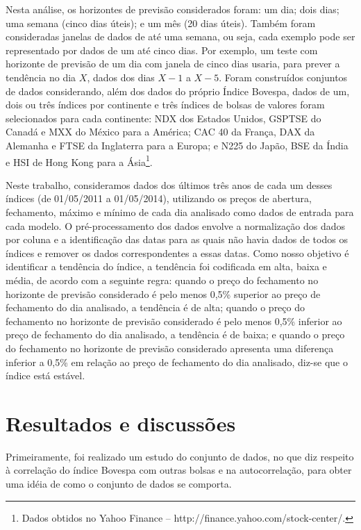 \documentclass[12pt,a4paper,utf8]{ppgsi}
\begin{document}
    Nesta análise, os horizontes de previsão considerados foram: um dia; dois dias; uma semana (cinco dias úteis); e um mês (20 dias úteis). Também foram consideradas janelas de dados de até uma semana, ou seja, cada exemplo pode ser representado por dados de um até cinco dias. Por exemplo, um teste com horizonte de previsão de um dia com janela de cinco dias usaria, para prever a tendência no dia $X$, dados dos dias $X-1$ a $X-5$. Foram construídos conjuntos de dados considerando, além dos dados do próprio Índice Bovespa, dados de um, dois ou três índices por continente e três índices de bolsas de valores foram selecionados para cada continente: NDX dos Estados Unidos, GSPTSE do Canadá e MXX do México para a América; CAC 40 da França, DAX da Alemanha e FTSE da Inglaterra para a Europa; e N225 do Japão, BSE da Índia e HSI de Hong Kong para a Ásia\footnote{Dados obtidos no Yahoo Finance -- http://finance.yahoo.com/stock-center/.}.

    Neste trabalho, consideramos dados dos últimos três anos de cada um desses índices (de 01/05/2011 a 01/05/2014), utilizando os preços de abertura, fechamento, máximo e mínimo de cada dia analisado como dados de entrada para cada modelo. O pré-processamento dos dados envolve a normalização dos dados por coluna e a identificação das datas para as quais não havia dados de todos os índices e remover os dados correspondentes a essas datas. Como nosso objetivo é identificar a tendência do índice, a tendência foi codificada em alta, baixa e média, de acordo com a seguinte regra: quando o preço do fechamento no horizonte de previsão considerado é pelo menos 0,5\% superior ao preço de fechamento do dia analisado, a tendência é de alta; quando o preço do fechamento no horizonte de previsão considerado é pelo menos 0,5\% inferior ao preço de fechamento do dia analisado, a tendência é de baixa; e  quando o preço do fechamento no horizonte de previsão considerado apresenta uma diferença inferior a 0,5\% em relação ao preço de fechamento do dia analisado, diz-se que o índice está estável.

        \section{Resultados e discussões} \label{sec:resultados}

            Primeiramente, foi realizado um estudo do conjunto de dados, no que diz respeito à correlação do índice Bovespa com outras bolsas e na autocorrelação, para obter uma idéia de como o conjunto de dados se comporta.
\end{document}
